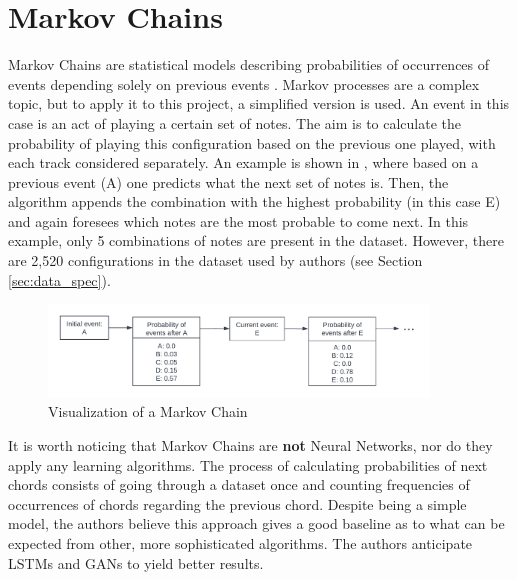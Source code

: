 \documentclass[a4paper, 11pt, twoside]{report}
\theoremstyle{definition}
\begin{document}
\FloatBarrier


\section{Markov Chains}

Markov Chains are statistical models describing probabilities of occurrences of events depending solely on previous events \cite{MarkovChain}. Markov processes are a complex topic, but to apply it to this project, a simplified version is used. An event in this case is an act of playing a certain set of notes. The aim is to calculate the probability of playing this configuration based on the previous one played, with each track considered separately. An example is shown in , where based on a previous event (A) one predicts what the next set of notes is. Then, the algorithm appends the combination with the highest probability (in this case E) and again foresees which notes are the most probable to come next. In this example, only 5 combinations of notes are present in the dataset. However, there are 2,520 configurations in the dataset used by authors (see Section \ref{sec:data_spec}). \par

\begin{figure}[H]
    \begin{center}
        \includegraphics[width=0.9\textwidth]{assets/markov_chain_diagram.png}
        \caption{Visualization of a Markov Chain}
        \label{fig:markov_diagram}
    \end{center}
\end{figure}

It is worth noticing that Markov Chains are \textbf{not} Neural Networks, nor do they apply any learning algorithms. The process of calculating probabilities of next chords consists of going through a dataset once and counting frequencies of occurrences of chords regarding the previous chord. Despite being a simple model, the authors believe this approach gives a good baseline as to what can be expected from other, more sophisticated algorithms. The authors anticipate LSTMs and GANs to yield better results. \par
\end{document}
